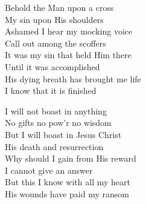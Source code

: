 \documentclass{beamer}
\begin{document}
{\begin{frame}{}
Behold the Man upon a cross\\ 
My sin upon His shoulders\\ 
Ashamed I hear my mocking voice\\ 
Call out among the scoffers\\ 
It was my sin that held Him there\\ 
Until it was accomplished\\ 
His dying breath has brought me life\\ 
I know that it is finished 

\end{frame}

\hypertarget{How deep the Father's love for us[](Townend)3}{}
\begin{frame}{}
\fontsize{ 18 }{ 23 }\selectfont

I will not boast in anything\\ 
No gifts no pow’r no wisdom\\ 
But I will boast in Jesus Christ\\ 
His death and resurrection\\ 
Why should I gain from His reward\\ 
I cannot give an answer\\ 
But this I know with all my heart\\ 
His wounds have paid my ransom 

\end{frame}

}
 
\end{document}
